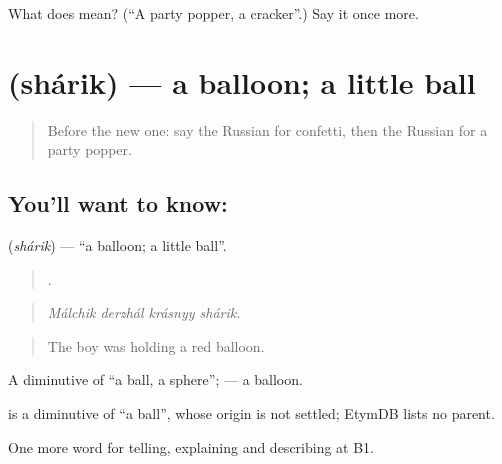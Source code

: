 \begin{tcolorbox}[breakable,colback=teal!4,colframe=teal!35!black,title={Before you move on}]
What does  mean? (\textquotedblleft{}A party popper, a cracker\textquotedblright{}.) Say it once more.
\end{tcolorbox}
\section[\texorpdfstring{\ru{шарик} (shárik)}{шарик (shárik)}]{ (shárik) — a balloon; a little ball}

\label{lesson:RU-C314-sharik}



\begin{quote}
Before the new one: say the Russian for confetti, then the Russian for a party popper.
\end{quote}

\subsection*{You'll want to know: }
\textbf{} (\emph{shárik}) — \textquotedblleft{}a balloon; a little ball\textquotedblright{}.

\begin{quote}
   .
\end{quote}

\begin{quote}
\emph{Málchik derzhál krásnyy shárik.}
\end{quote}

\begin{quote}
The boy was holding a red balloon.
\end{quote}

A diminutive of \emph{} \textquotedblleft{}a ball, a sphere\textquotedblright{}; \emph{ } — a balloon.

\begin{cousinweb}
\emph{} is a diminutive of \emph{} \textquotedblleft{}a ball\textquotedblright{}, whose origin is not settled; EtymDB lists no parent.
\end{cousinweb}

\begin{grammarlens}[title={What you've built}]
One more word for telling, explaining and describing at B1.
\end{grammarlens}

